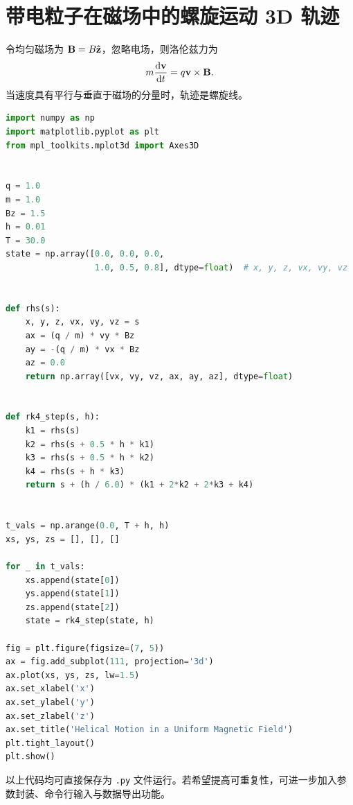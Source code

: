 \section{带电粒子在磁场中的螺旋运动 3D 轨迹}

令均匀磁场为 $\vb{B}=B\vu{z}$，忽略电场，则洛伦兹力为
\[
 m\dv{\vb{v}}{t}=q\vb{v}\times\vb{B}.
\]
当速度具有平行与垂直于磁场的分量时，轨迹是螺旋线。

\begin{lstlisting}[language=Python]
import numpy as np
import matplotlib.pyplot as plt
from mpl_toolkits.mplot3d import Axes3D


q = 1.0
m = 1.0
Bz = 1.5
h = 0.01
T = 30.0
state = np.array([0.0, 0.0, 0.0,
                  1.0, 0.5, 0.8], dtype=float)  # x, y, z, vx, vy, vz


def rhs(s):
    x, y, z, vx, vy, vz = s
    ax = (q / m) * vy * Bz
    ay = -(q / m) * vx * Bz
    az = 0.0
    return np.array([vx, vy, vz, ax, ay, az], dtype=float)


def rk4_step(s, h):
    k1 = rhs(s)
    k2 = rhs(s + 0.5 * h * k1)
    k3 = rhs(s + 0.5 * h * k2)
    k4 = rhs(s + h * k3)
    return s + (h / 6.0) * (k1 + 2*k2 + 2*k3 + k4)


t_vals = np.arange(0.0, T + h, h)
xs, ys, zs = [], [], []

for _ in t_vals:
    xs.append(state[0])
    ys.append(state[1])
    zs.append(state[2])
    state = rk4_step(state, h)

fig = plt.figure(figsize=(7, 5))
ax = fig.add_subplot(111, projection='3d')
ax.plot(xs, ys, zs, lw=1.5)
ax.set_xlabel('x')
ax.set_ylabel('y')
ax.set_zlabel('z')
ax.set_title('Helical Motion in a Uniform Magnetic Field')
plt.tight_layout()
plt.show()
\end{lstlisting}

以上代码均可直接保存为 \texttt{.py} 文件运行。若希望提高可重复性，可进一步加入参数封装、命令行输入与数据导出功能。
